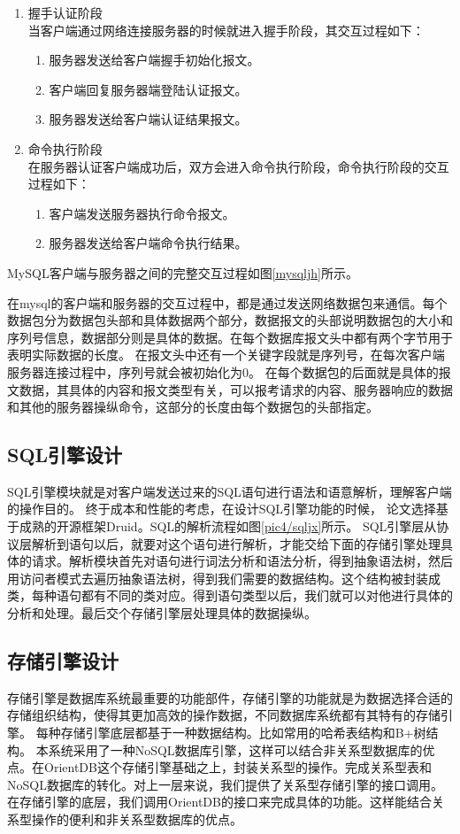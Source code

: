 \begin{enumerate}[fullwidth,itemindent=2em,listparindent=2em]
	\item 握手认证阶段\\
	当客户端通过网络连接服务器的时候就进入握手阶段，其交互过程如下：
	\begin{enumerate}
		\item 服务器发送给客户端握手初始化报文。
		\item 客户端回复服务器端登陆认证报文。
		\item 服务器发送给客户端认证结果报文。
	\end{enumerate}
	\item 命令执行阶段\\
	在服务器认证客户端成功后，双方会进入命令执行阶段，命令执行阶段的交互过程如下：
	\begin{enumerate}
		\item 	客户端发送服务器执行命令报文。
		\item 服务器发送给客户端命令执行结果。
	\end{enumerate}
\end{enumerate}

MySQL客户端与服务器之间的完整交互过程如图\ref{mysqljh}所示。

在mysql的客户端和服务器的交互过程中，都是通过发送网络数据包来通信。每个数据包分为数据包头部和具体数据两个部分，数据报文的头部说明数据包的大小和序列号信息，数据部分则是具体的数据。在每个数据库报文头中都有两个字节用于表明实际数据的长度。
在报文头中还有一个关键字段就是序列号，在每次客户端服务器连接过程中，序列号就会被初始化为0。
在每个数据包的后面就是具体的报文数据，其具体的内容和报文类型有关，可以报考请求的内容、服务器响应的数据和其他的服务器操纵命令，这部分的长度由每个数据包的头部指定。
\subsection{SQL引擎设计}
SQL引擎模块就是对客户端发送过来的SQL语句进行语法和语意解析，理解客户端的操作目的。
终于成本和性能的考虑，在设计SQL引擎功能的时候，
论文选择基于成熟的开源框架Druid。SQL的解析流程如图\ref{pic4/sqljx}所示。
SQL引擎层从协议层解析到语句以后，就要对这个语句进行解析，才能交给下面的存储引擎处理具体的请求。解析模块首先对语句进行词法分析和语法分析，得到抽象语法树，然后用访问者模式去遍历抽象语法树，得到我们需要的数据结构。这个结构被封装成类，每种语句都有不同的类对应。得到语句类型以后，我们就可以对他进行具体的分析和处理。最后交个存储引擎层处理具体的数据操纵。
\subsection{存储引擎设计}
存储引擎是数据库系统最重要的功能部件，存储引擎的功能就是为数据选择合适的存储组织结构，使得其更加高效的操作数据，不同数据库系统都有其特有的存储引擎。
每种存储引擎底层都基于一种数据结构。比如常用的哈希表结构和B+树结构。
本系统采用了一种NoSQL数据库引擎，这样可以结合非关系型数据库的优点。在OrientDB这个存储引擎基础之上，封装关系型的操作。完成关系型表和NoSQL数据库的转化。对上一层来说，我们提供了关系型存储引擎的接口调用。在存储引擎的底层，我们调用OrientDB的接口来完成具体的功能。这样能结合关系型操作的便利和非关系型数据库的优点。
